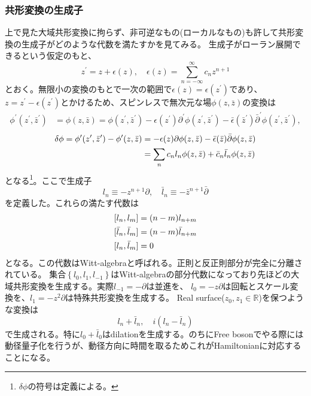 \documentclass[11pt, aps, longbibliography]{article}
\numberwithin{equation}{section}
\begin{document}
    \subsubsection{共形変換の生成子}
        上で見た大域共形変換に拘らず、非可逆なもの(ローカルなもの)も許して共形変換の生成子がどのような代数を満たすかを見てみる。
        生成子がローラン展開できるという仮定のもと、
        \begin{equation}
            z^\prime = z + \epsilon(z), \quad \epsilon(z) = \sum_{n = -\infty}^{\infty}c_n z^{n+1}
        \end{equation}
        とおく。無限小の変換のもとで一次の範囲で$\epsilon(z)=\epsilon(z^\prime)$であり、$z=z^\prime-\epsilon(z^\prime)$とかけるため、スピンレスで無次元な場$\phi(z,\bar{z})$の変換は
        \begin{align}
            \phi^\prime(z^\prime,\bar{z}^\prime) &= \phi(z,\bar{z}) = \phi(z^\prime, \bar{z}^\prime) - \epsilon(z^\prime)\partial^\prime \phi(z^\prime, \bar{z}^\prime) - \bar{\epsilon}(\bar{z}^\prime) \bar{\partial}^\prime \phi(z^\prime, \bar{z}^\prime), 
        \end{align}
        \begin{align}
            \delta \phi = \phi^\prime(z^\prime, \bar{z}^\prime) - \phi^\prime(z, \bar{z}) &= -\epsilon(z)\partial \phi(z,\bar{z}) - \bar{\epsilon}(\bar{z})\bar{\partial}\phi(z, \bar{z}) \notag \\
            &= \sum_n c_n l_n \phi(z, \bar{z}) + \bar{c}_n \bar{l}_n \phi(z, \bar{z})
        \end{align}
        となる\footnote{$\delta \phi$の符号は定義による。}。ここで生成子
        \begin{equation}\label{eq:def-Witt-gens}
            l_n \equiv -z^{n+1}\partial, \quad \bar{l}_n \equiv -\bar{z}^{n+1}\bar{\partial}
        \end{equation}
        を定義した。これらの満たす代数は
        \begin{align}\label{eq:Witt-alg}
            &[l_n, l_m] = (n-m)l_{n+m} \notag \\
            &[\bar{l}_n, \bar{l}_m] = (n-m)\bar{l}_{n+m} \\
            &[l_n, \bar{l}_m] = 0 \notag 
        \end{align}
        となる。この代数はWitt-algebraと呼ばれる。正則と反正則部分が完全に分離されている。
        集合$\left\{l_0, l_1, l_{-1}\right\}$はWitt-algebraの部分代数になっており先ほどの大域共形変換を生成する。実際$l_{-1}=-\partial$は並進を、
        $l_0 = -z\partial$は回転とスケール変換を、$l_1=-z^2\partial$は特殊共形変換を生成する。
        Real surface($z_0, z_1 \in \mathbb{R}$)を保つような変換は
        \begin{equation}
            l_n + \bar{l}_{n}, \quad i(l_n - \bar{l}_{n})
        \end{equation}
        で生成される。特に$l_0 + \bar{l}_{0}$はdilationを生成する。のちにFree bosonでやる際には動径量子化を行うが、動径方向に時間を取るためこれがHamiltonianに対応することになる。
\end{document}
